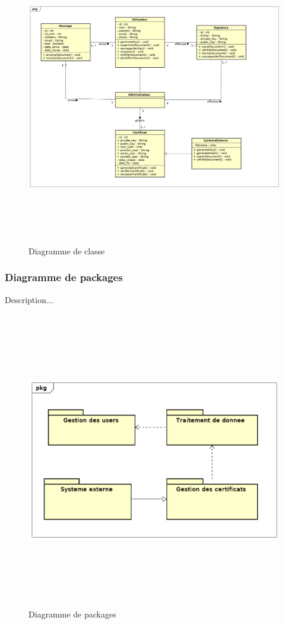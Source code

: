 			 	
			\begin{figure}[H]
					\centering
					\includegraphics[width=18cm, height=13cm]{../Diagrammes/DigrammeClass/ClassDiagram.png}
					\caption{Diagramme de classe}
					\label{diaclass}
			\end{figure}	
			
			
		\subsubsection{Diagramme de packages}
		Description...
				\begin{figure}[H]
					\centering
					\includegraphics[width=18cm, height=13cm]{../Diagrammes/DigrammeClass/diagrammepackage.png}
					\caption{Diagramme de packages}
					\label{diapackage}
			\end{figure}
		
